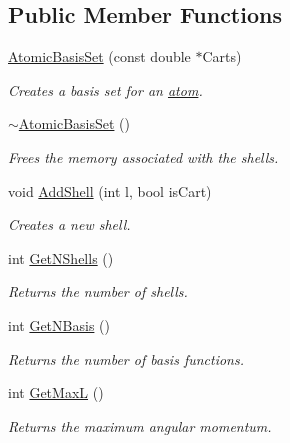 \subsection*{Public Member Functions}
\begin{DoxyCompactItemize}
\item 
\hyperlink{classJKBuilder_1_1AtomicBasisSet_aba418bbf95a1242f52a30da3bfd01b8c}{AtomicBasisSet} (const double $\ast$Carts)
\begin{DoxyCompactList}\small\item\em Creates a basis set for an \hyperlink{classJKBuilder_1_1atom}{atom}. \item\end{DoxyCompactList}\item 
\hyperlink{classJKBuilder_1_1AtomicBasisSet_a7c7450d3b14d5416225a628fbdff0a1a}{$\sim$AtomicBasisSet} ()
\begin{DoxyCompactList}\small\item\em Frees the memory associated with the shells. \item\end{DoxyCompactList}\item 
void \hyperlink{classJKBuilder_1_1AtomicBasisSet_aad8da23b7ac00a4855a0eed27e9af7cd}{AddShell} (int l, bool isCart)
\begin{DoxyCompactList}\small\item\em Creates a new shell. \item\end{DoxyCompactList}\item 
int \hyperlink{classJKBuilder_1_1AtomicBasisSet_aa62be7e63d0f2b5828ab72cec3ce8590}{GetNShells} ()
\begin{DoxyCompactList}\small\item\em Returns the number of shells. \item\end{DoxyCompactList}\item 
int \hyperlink{classJKBuilder_1_1AtomicBasisSet_a297c144fb990284ac5973c99cdd55f91}{GetNBasis} ()
\begin{DoxyCompactList}\small\item\em Returns the number of basis functions. \item\end{DoxyCompactList}\item 
int \hyperlink{classJKBuilder_1_1AtomicBasisSet_af6694a93cc5d86a8f3cd1aa984a0cdc3}{GetMaxL} ()
\begin{DoxyCompactList}\small\item\em Returns the maximum angular momentum. \item\end{DoxyCompactList}\item 

\end{DoxyCompactItemize}
